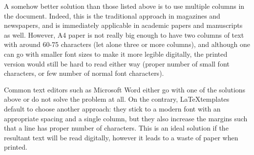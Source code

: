 \vspace*{-\baselineskip}
	\begin{multicols}{2}
	A somehow better solution than those listed above is to use multiple columns in the document. Indeed, this is the traditional approach in magazines and newspapers, and is immediately applicable in academic papers and manuscripts as well. However, A4 paper is not really big enough to have two columns of text with around 60-75 characters (let alone three or more columns), and although one can go with smaller font sizes to make it more legible digitally, the printed version would still be hard to read either way (proper number of small font characters, or few number of normal font characters).
\end{multicols}
\endfullwidth 
\begincenter
\qquad Common text editors such as Microsoft Word either go with one of the solutions above or do not solve the problem at all. On the contrary, \LaTeX\;templates default to choose another approach: they stick to a modern font with an appropriate spacing and a single column, but they also increase the margins such that a line has proper number of characters. This is an ideal solution if the resultant text will be read digitally, however it leads to a waste of paper when printed.
\endcenter
\vspace*{\baselineskip}
\sidebar{\vspace*{50\baselineskip}}
